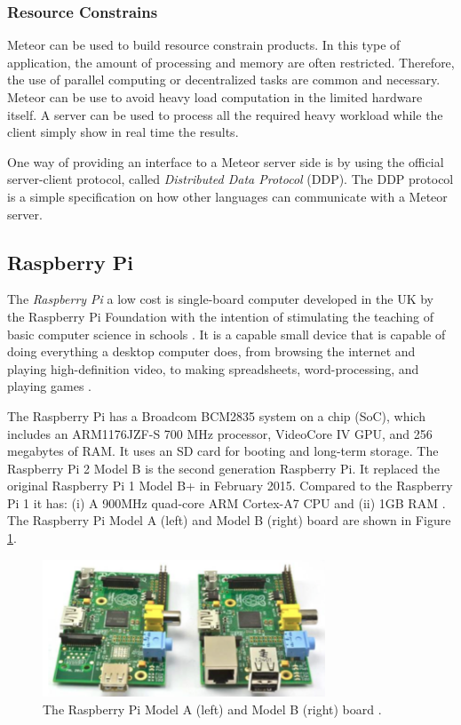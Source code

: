 \subsubsection{Resource Constrains}

Meteor can be used to build resource constrain products.
In this type of application, the amount of processing and memory are often restricted.
Therefore, the use of parallel computing or decentralized tasks are common and necessary.
Meteor can be use to avoid heavy load computation in the limited hardware itself.
A server can be used to process all the required heavy workload while the client simply show in real time the results.

One way of providing an interface to a Meteor server side is by using the official server-client protocol, called \emph{Distributed Data Protocol} (DDP).
The DDP protocol is a simple specification on how other languages can communicate with a Meteor server.


\subsection{Raspberry Pi}


The \emph{Raspberry Pi} a low cost is single-board computer developed in the UK by the Raspberry Pi Foundation with the intention of stimulating the teaching of basic computer science in schools \cite{pi2012raspberry}.
It is a capable small device that is capable of doing everything a desktop computer does, from browsing the internet and playing high-definition video, to making spreadsheets, word-processing, and playing games \cite{resp2}.



The Raspberry Pi has a Broadcom BCM2835 system on a chip (SoC), which includes an ARM1176JZF-S 700 MHz processor, VideoCore IV GPU, and 256 megabytes of RAM. 
It uses an SD card for booting and long-term storage.
The Raspberry Pi 2 Model B is the second generation Raspberry Pi. 
It replaced the original Raspberry Pi 1 Model B+ in February 2015. 
Compared to the Raspberry Pi 1 it has: (i) A 900MHz quad-core ARM Cortex-A7 CPU and (ii) 1GB RAM \cite{resp2}.
The Raspberry Pi Model A (left) and Model B (right) board are shown in Figure \ref{fig:resp}.


\begin{figure}[htbp]
\begin{center}
\includegraphics[width=0.75\textwidth]{figures/resppi.png}
\caption{The Raspberry Pi Model A (left) and Model B (right) board \cite{resp2}.}
\label{fig:resp}
\end{center}
\end{figure}



